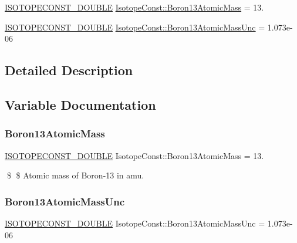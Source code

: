 \begin{DoxyCompactItemize}
\item 
\mbox{\hyperlink{group___isotope_const-_macros_ga8f45a7272ce02c0b4c65c44636ed719a}{I\+S\+O\+T\+O\+P\+E\+C\+O\+N\+S\+T\+\_\+\+D\+O\+U\+B\+LE}} \mbox{\hyperlink{group___isotope_const-_boron-_b13_ga0bc228da26570236171457a6d4fa388d}{Isotope\+Const\+::\+Boron13\+Atomic\+Mass}} = 13.
\item 
\mbox{\hyperlink{group___isotope_const-_macros_ga8f45a7272ce02c0b4c65c44636ed719a}{I\+S\+O\+T\+O\+P\+E\+C\+O\+N\+S\+T\+\_\+\+D\+O\+U\+B\+LE}} \mbox{\hyperlink{group___isotope_const-_boron-_b13_ga19f607527222656e81e5a300605cae25}{Isotope\+Const\+::\+Boron13\+Atomic\+Mass\+Unc}} = 1.\+073e-\/06
\end{DoxyCompactItemize}


\subsection{Detailed Description}


\subsection{Variable Documentation}
\mbox{\label{group___isotope_const-_boron-_b13_ga0bc228da26570236171457a6d4fa388d}} 
\subsubsection{\texorpdfstring{Boron13\+Atomic\+Mass}{Boron13AtomicMass}}
{\footnotesize\ttfamily \mbox{\hyperlink{group___isotope_const-_macros_ga8f45a7272ce02c0b4c65c44636ed719a}{I\+S\+O\+T\+O\+P\+E\+C\+O\+N\+S\+T\+\_\+\+D\+O\+U\+B\+LE}} Isotope\+Const\+::\+Boron13\+Atomic\+Mass = 13.}

\$ \$ Atomic mass of Boron-\/13 in amu. \mbox{\label{group___isotope_const-_boron-_b13_ga19f607527222656e81e5a300605cae25}} 
\subsubsection{\texorpdfstring{Boron13\+Atomic\+Mass\+Unc}{Boron13AtomicMassUnc}}
{\footnotesize\ttfamily \mbox{\hyperlink{group___isotope_const-_macros_ga8f45a7272ce02c0b4c65c44636ed719a}{I\+S\+O\+T\+O\+P\+E\+C\+O\+N\+S\+T\+\_\+\+D\+O\+U\+B\+LE}} Isotope\+Const\+::\+Boron13\+Atomic\+Mass\+Unc = 1.\+073e-\/06}

